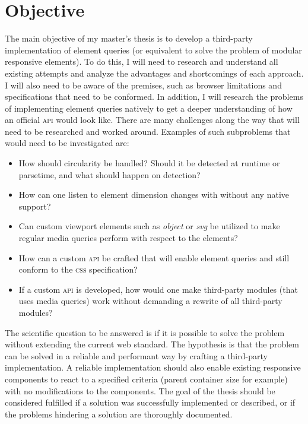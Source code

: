 \documentclass[oneside,a4paper,11pt]{kth-mag}
\begin{document}
\section*{Objective}
The main objective of my master's thesis is to develop a third-party implementation of element queries (or equivalent to solve the problem of modular responsive elements). To do this, I will need to research and understand all existing attempts and analyze the advantages and shortcomings of each approach. I will also need to be aware of the premises, such as browser limitations and specifications that need to be conformed. In addition, I will research the problems of implementing element queries natively to get a deeper understanding of how an official \textsc{api} would look like. There are many challenges along the way that will need to be researched and worked around. Examples of such subproblems that would need to be investigated are:
\begin{itemize}
\item How should circularity be handled? Should it be detected at runtime or parsetime, and what should happen on detection?
\item How can one listen to element dimension changes with without any native support?
\item Can custom viewport elements such as \emph{object} or \emph{svg} be utilized to make regular media queries perform with respect to the elements?
\item How can a custom \textsc{api} be crafted that will enable element queries and still conform to the \textsc{css} specification?
\item If a custom \textsc{api} is developed, how would one make third-party modules (that uses media queries) work without demanding a rewrite of all third-party modules?
\end{itemize}
The scientific question to be answered is if it is possible to solve the problem  without extending the current web standard. The hypothesis is that the problem can be solved in a reliable and performant way by crafting a third-party implementation. A reliable implementation should also enable existing responsive components to react to a specified criteria (parent container size for example) with no modifications to the components. The goal of the thesis should be considered fulfilled if a solution was successfully implemented or described, or if the problems hindering a solution are thoroughly documented.
\end{document}
